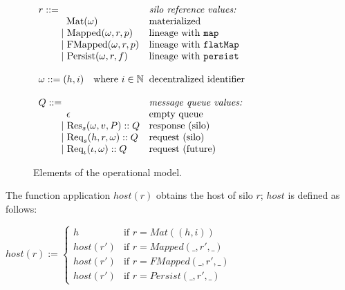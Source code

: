 %
%

\begin{figure}
\centering

$\ba[t]{l@{\hspace{2mm}}l}
r ::=                                                  & \mbox{{\it{silo reference values:}}} \\
\gap \:\:\:\: \text{Mat}(\omega)                       & \mbox{materialized}                  \\
\gap ~|~  \text{Mapped}(\omega, r, p)                  & \mbox{lineage with \texttt{map}}     \\
\gap ~|~  \text{FMapped}(\omega, r, p)                 & \mbox{lineage with \texttt{flatMap}} \\
\gap ~|~  \text{Persist}(\omega, r, f)                 & \mbox{lineage with \texttt{persist}} \\
                                                       & \\
\omega  ::= (h,i) \quad \text{where}~i \in \mathbb{N}  & \mbox{decentralized identifier}      \\
                                                       & \\
Q      ::=                                             & \mbox{{\it{message queue values:}}}  \\
\gap \:\:\:\: \epsilon                                 & \mbox{empty queue}       \\
\gap ~|~    {\Res \omega v P} :: Q                     & \mbox{response (silo)}   \\
\gap ~|~    {\Req h r \omega} :: Q                     & \mbox{request (silo)}    \\
\gap ~|~    {\ReqF \iota \omega} :: Q                  & \mbox{request (future)}  \\
\ea$

\caption{Elements of the operational model.}\label{fig:elems-opsem}
\end{figure}



\begin{defn}[Host]
  The function application $host(r)$ obtains the host of silo $r$;
  $host$ is defined as follows:

  $host(r) := \left\{\begin{array}{ll}
      h         & \text{if } r = Mat((h, i)) \\
      host(r')  & \text{if } r = Mapped(\_, r', \_) \\
      host(r')  & \text{if } r = FMapped(\_, r', \_) \\
      host(r')  & \text{if } r = Persist(\_, r', \_)
    \end{array}\right.$
\end{defn}

